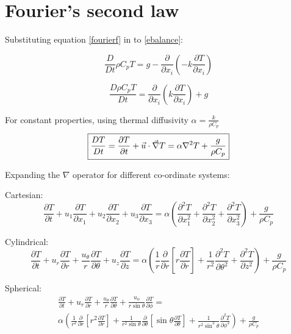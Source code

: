\section{Fourier's second law}

Substituting equation \ref{fourierf} in to \ref{ebalance}:

$$ \frac{D}{Dt} \rho C_p T = g - \frac{\partial}{\partial x_i} \left( -k \frac{\partial T}{\partial x_i} \right) $$

\begin{equation}
\frac{D \rho C_p T}{Dt}  = \frac{\partial}{\partial x_i} \left(k \frac{\partial T}{\partial x_i} \right) + g
\label{fourier2a}
\end{equation}

For constant properties, using thermal diffusivity $\alpha = \frac{k}{\rho C_p}$
\begin{equation}
\boxed{
\frac{DT}{Dt} = \frac{\partial T}{\partial t} + \vec{u} \cdot \vec{\nabla} T  = \alpha \nabla^2 T + \frac{g}{\rho C_p}
}
\label{fourier2b1}
\end{equation}

Expanding the $\nabla$ operator for different co-ordinate systems:

Cartesian:
\begin{equation}
\frac{\partial T}{\partial t} + u_1 \frac{\partial T}{\partial x_1} +  u_2 \frac{\partial T}{\partial x_2} + u_3 \frac{\partial T}{\partial x_3} = \alpha \left( \frac{\partial^2 T}{\partial x_1^2} + \frac{\partial^2 T}{\partial x_2^2} + \frac{\partial^2 T}{\partial x_3^2}\right)  + \frac{g}{\rho C_p}
\end{equation}

Cylindrical:
\begin{equation}
\frac{\partial T}{\partial t} + u_r \frac{\partial T}{\partial r} + \frac{u_\theta}{r} \frac{\partial T}{\partial \theta} + u_z \frac{\partial T}{\partial z}  = \alpha \left( \frac{1}{r} \frac{\partial}{\partial r} \left[ r \frac{\partial T}{\partial r} \right] + \frac{1}{r^2} \frac{\partial^2 T}{\partial \theta^2} + \frac{\partial^2 T}{\partial z^2}\right)  + \frac{g}{\rho C_p}
\end{equation}

Spherical:
\begin{align}
\frac{\partial T}{\partial t} + u_r \frac{\partial T}{\partial r} + \frac{u_\theta}{r} \frac{\partial T}{\partial \theta} + \frac{u_\phi}{r\sin\theta} \frac{\partial T}{\partial \phi} = \nonumber \\
\alpha \left( \frac{1}{r^2} \frac{\partial}{\partial r} \left[ r^2 \frac{\partial T}{\partial r} \right] + \frac{1}{r^2 \sin\theta} \frac{\partial}{\partial \theta} \left[ \sin\theta \frac{\partial T}{\partial \theta} \right] + \frac{1}{r^2 \sin^2 \theta} \frac{\partial^2 T}{\partial \phi^2}\right)  + \frac{g}{\rho C_p}
\end{align}

